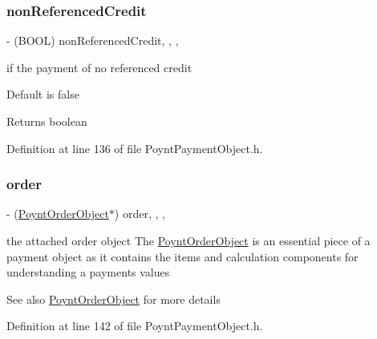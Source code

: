 \subsubsection{\texorpdfstring{non\+Referenced\+Credit}{nonReferencedCredit}}
{\footnotesize\ttfamily -\/ (B\+O\+OL) non\+Referenced\+Credit\hspace{0.3cm}{\ttfamily [read]}, {\ttfamily [write]}, {\ttfamily [nonatomic]}, {\ttfamily [assign]}}



if the payment of no referenced credit 

Default is false

\begin{DoxyReturn}{Returns}
boolean 
\end{DoxyReturn}


Definition at line 136 of file Poynt\+Payment\+Object.\+h.

\hypertarget{interface_poynt_payment_object_a570f3f5a3eb312987a97d46c0ba10a9d}{}\label{interface_poynt_payment_object_a570f3f5a3eb312987a97d46c0ba10a9d} 
\subsubsection{\texorpdfstring{order}{order}}
{\footnotesize\ttfamily -\/ (\hyperlink{interface_poynt_order_object}{Poynt\+Order\+Object}$\ast$) order\hspace{0.3cm}{\ttfamily [read]}, {\ttfamily [write]}, {\ttfamily [nonatomic]}, {\ttfamily [strong]}}



the attached order object  The \hyperlink{interface_poynt_order_object}{Poynt\+Order\+Object} is an essential piece of a payment object as it contains the items and calculation components for understanding a payments values 

\begin{DoxySeeAlso}{See also}
\hyperlink{interface_poynt_order_object}{Poynt\+Order\+Object} for more details 
\end{DoxySeeAlso}


Definition at line 142 of file Poynt\+Payment\+Object.\+h.

\hypertarget{interface_poynt_payment_object_aac2b120e80b4b9e69c3a577c4f31ed31}{}\label{interface_poynt_payment_object_aac2b120e80b4b9e69c3a577c4f31ed31} 
